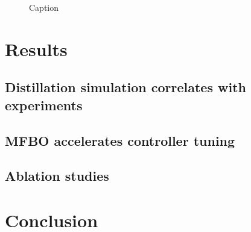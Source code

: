 \begin{figure}

    \caption{Caption}
    \label{fig:validation}
\end{figure}

\section{Results}

\subsection{Distillation simulation correlates with experiments}



\subsection{MFBO accelerates controller tuning}





\subsection{Ablation studies}




\section{Conclusion}